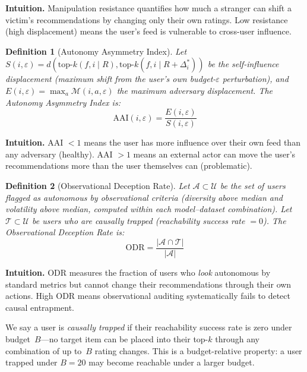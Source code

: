 \documentclass[sigconf,anonymous]{acmart}
\newtheorem{definition}{Definition}
\begin{document}
\noindent \textbf{Intuition.} Manipulation resistance quantifies how much a stranger can shift a victim's recommendations by changing only their own ratings. Low resistance (high displacement) means the user's feed is vulnerable to cross-user influence.

\begin{definition}[Autonomy Asymmetry Index]
\label{def:aai}
Let $S(i, \varepsilon) = d(\text{top-}k(f, i \mid R), \text{top-}k(f, i \mid R + \Delta_i^*))$ be the self-influence displacement (maximum shift from the user's own budget-$\varepsilon$ perturbation), and $E(i, \varepsilon) = \max_a \mathcal{M}(i, a, \varepsilon)$ the maximum adversary displacement. The Autonomy Asymmetry Index is:
\begin{equation}
    \text{AAI}(i, \varepsilon) = \frac{E(i, \varepsilon)}{S(i, \varepsilon)}
\end{equation}
\end{definition}

\noindent \textbf{Intuition.} AAI $< 1$ means the user has more influence over their own feed than any adversary (healthy). AAI $> 1$ means an external actor can move the user's recommendations more than the user themselves can (problematic).

\begin{definition}[Observational Deception Rate]
\label{def:odr}
Let $\mathcal{A} \subset \mathcal{U}$ be the set of users flagged as autonomous by observational criteria (diversity above median \emph{and} volatility above median, computed within each model--dataset combination). Let $\mathcal{T} \subset \mathcal{U}$ be users who are causally trapped (reachability success rate $= 0$). The Observational Deception Rate is:
\begin{equation}
    \text{ODR} = \frac{|\mathcal{A} \cap \mathcal{T}|}{|\mathcal{A}|}
\end{equation}
\end{definition}

\noindent \textbf{Intuition.} ODR measures the fraction of users who \emph{look} autonomous by standard metrics but cannot change their recommendations through their own actions. High ODR means observational auditing systematically fails to detect causal entrapment.

We say a user is \textit{causally trapped} if their reachability success rate is zero under budget~$B$---no target item can be placed into their top-$k$ through any combination of up to~$B$ rating changes. This is a budget-relative property: a user trapped under $B = 20$ may become reachable under a larger budget.
\end{document}
